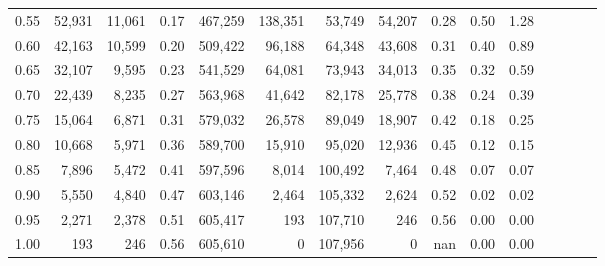 \begin{tabular}{rrrcrrrrrrrrrrr}
0.55 &  52,931 &  11,061 &                                       0.17 &  467,259 &  138,351 &   53,749 &   54,207 &  0.28 &  0.50 &                         1.28 \\
0.60 &  42,163 &  10,599 &                                       0.20 &  509,422 &   96,188 &   64,348 &   43,608 &  0.31 &  0.40 &                         0.89 \\
0.65 &  32,107 &   9,595 &                                       0.23 &  541,529 &   64,081 &   73,943 &   34,013 &  0.35 &  0.32 &                         0.59 \\
0.70 &  22,439 &   8,235 &                                       0.27 &  563,968 &   41,642 &   82,178 &   25,778 &  0.38 &  0.24 &                         0.39 \\
0.75 &  15,064 &   6,871 &                                       0.31 &  579,032 &   26,578 &   89,049 &   18,907 &  0.42 &  0.18 &                         0.25 \\
0.80 &  10,668 &   5,971 &                                       0.36 &  589,700 &   15,910 &   95,020 &   12,936 &  0.45 &  0.12 &                         0.15 \\
0.85 &   7,896 &   5,472 &                                       0.41 &  597,596 &    8,014 &  100,492 &    7,464 &  0.48 &  0.07 &                         0.07 \\
0.90 &   5,550 &   4,840 &                                       0.47 &  603,146 &    2,464 &  105,332 &    2,624 &  0.52 &  0.02 &                         0.02 \\
0.95 &   2,271 &   2,378 &                                       0.51 &  605,417 &      193 &  107,710 &      246 &  0.56 &  0.00 &                         0.00 \\
1.00 &     193 &     246 &                                       0.56 &  605,610 &        0 &  107,956 &        0 &   nan &  0.00 &                         0.00 \\
\bottomrule
\end{tabular}
